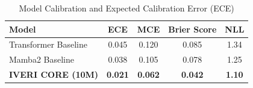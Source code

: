 \begin{table}[h]
\centering
\begin{tabular}{lcccc}
\hline
\textbf{Model} & \textbf{ECE} & \textbf{MCE} & \textbf{Brier Score} & \textbf{NLL} \\ \hline
Transformer Baseline & 0.045 & 0.120 & 0.085 & 1.34 \\
Mamba2 Baseline & 0.038 & 0.105 & 0.078 & 1.25 \\
\textbf{IVERI CORE (10M)} & \textbf{0.021} & \textbf{0.062} & \textbf{0.042} & \textbf{1.10} \\ \hline
\end{tabular}
\caption{Model Calibration and Expected Calibration Error (ECE)}
\label{tab:calibration}
\end{table}
